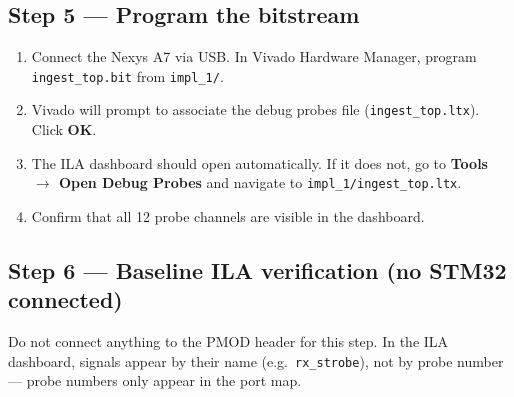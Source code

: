 \documentclass[11pt,letterpaper]{article}
\begin{document}
\subsection{Step 5 --- Program the bitstream}
\begin{enumerate}[leftmargin=2em]
	\item Connect the Nexys A7 via USB. In Vivado Hardware Manager, program \texttt{ingest\_top.bit} from \texttt{impl\_1/}.
	\item Vivado will prompt to associate the debug probes file (\texttt{ingest\_top.ltx}). Click \textbf{OK}.
	\item The \mbox{ILA} dashboard should open automatically. If it does not, go to \textbf{Tools $\to$ Open Debug Probes} and navigate to \texttt{impl\_1/ingest\_top.ltx}.
	\item Confirm that all 12 probe channels are visible in the dashboard.
\end{enumerate}


\subsection{Step 6 --- Baseline ILA verification (no STM32 connected)}

Do not connect anything to the PMOD header for this step. In the \mbox{ILA} dashboard, signals appear by their name (e.g.\ \texttt{rx\_strobe}), not by probe number --- probe numbers only appear in the \VHDL{} port map.
\end{document}
